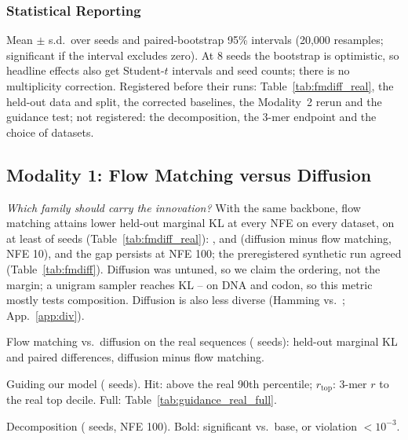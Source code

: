 \documentclass{article}
\begin{document}
\subsubsection{Statistical Reporting}
Mean $\pm$ s.d.\ over seeds and paired-bootstrap 95\% intervals (20{,}000 resamples; significant
if the interval excludes zero). At 8 seeds the bootstrap is optimistic, so headline effects also get
Student-$t$ intervals and seed counts; there is no multiplicity correction. Registered before their
runs: Table~\ref{tab:fmdiff_real}, the held-out data and split, the corrected baselines, the
Modality~2 rerun and the guidance test; not registered: the decomposition, the 3-mer endpoint and the choice of datasets.

\subsection{Modality 1: Flow Matching versus Diffusion}
\emph{Which family should carry the innovation?} With the same backbone, flow matching attains
lower held-out marginal KL at every NFE on every dataset, on at least \RealMinWins{} of \RealSeeds{}
seeds (Table~\ref{tab:fmdiff_real}):
\RealCIDna, \RealCIProt{} and \RealCICodon{} (diffusion minus flow matching, NFE 10), and the gap
persists at NFE 100; the preregistered synthetic run agreed (Table~\ref{tab:fmdiff}). Diffusion
was untuned, so we claim the ordering, not the margin; a unigram sampler reaches KL
\UniKLDNA--\UniKLCodon{} on DNA and codon, so this metric mostly tests composition. Diffusion is
also less diverse (Hamming \DiffHam{} vs.\ \FMHam; App.~\ref{app:div}).

\begin{table}[t]
\centering
\caption{Flow matching vs.\ diffusion on the real sequences (\RealSeeds{} seeds): held-out marginal KL and
paired differences, diffusion minus flow matching.}
\label{tab:fmdiff_real}
\footnotesize\begin{adjustbox}{max width=\textwidth}\end{adjustbox}
\end{table}

\begin{table}[t]
\centering
\begin{minipage}[t]{0.49\textwidth}\centering
\caption{Guiding our model (\GRSeeds{} seeds). Hit: above the real 90th percentile;
$r_{\text{top}}$: 3-mer $r$ to the real top decile. Full: Table~\ref{tab:guidance_real_full}.}
\label{tab:guidance_real}
\footnotesize\begin{adjustbox}{max width=\textwidth}\end{adjustbox}
\end{minipage}\hfill
\begin{minipage}[t]{0.49\textwidth}\centering
\caption{Decomposition (\MOneSeeds{} seeds, NFE 100). Bold: significant vs.\ base, or violation
$<10^{-3}$.}
\label{tab:decomp}
\footnotesize\begin{adjustbox}{max width=\textwidth}\end{adjustbox}
\end{minipage}
\end{table}
\end{document}
